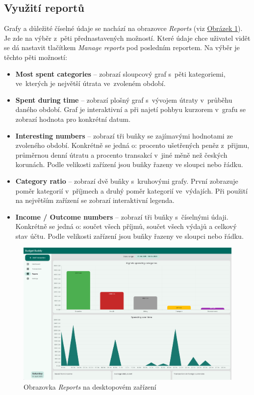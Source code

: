 \documentclass[
  biblatex,
  figures=true,
  tables=false,
  glossaries,
  index
]{kidiplom}
\begin{document}
\subsection{Využití reportů}
Grafy a důležité číselné údaje se nachází na obrazovce \textit{Reports} (viz \hyperref[fig:reports]{Obrázek \ref{fig:reports}}). Je zde na výběr z~pěti přednastavených možností. Které údaje chce uživatel vidět se dá nastavit tlačítkem \textit{Manage reports} pod posledním reportem. Na výběr je těchto pěti možností:
\begin{itemize}
  \item \textbf{Most spent categories} -- zobrazí sloupcový graf s~pěti kategoriemi, ve~kterých je největší útrata ve~zvoleném období.
  \item \textbf{Spent during time} -- zobrazí plošný graf s~vývojem útraty v~průběhu daného období. Graf je interaktivní a při najetí pohbyu kurzorem v~grafu se zobrazí hodnota pro konkrétní datum.
  \item \textbf{Interesting numbers} -- zobrazí tři buňky se zajímavými hodnotami ze zvoleného období. Konkrétně se jedná o: procento ušetřených peněz z~přijmu, průměrnou denní útratu a procento transakcí v~jiné měně než českých korunách. Podle velikosti zařízení jsou buňky řazeny ve sloupci nebo řádku.
  \item \textbf{Category ratio} -- zobrazí dvě buňky s~kruhovými grafy. První zobrazuje poměr kategorií v~příjmech a druhý poměr kategorií ve~výdajích. Při použití na největším zařízení se zobrazí interaktivní legenda.
  \item \textbf{Income / Outcome numbers} -- zobrazí tři buňky s~číselnými údaji. Konkrétně se jedná o: součet všech příjmů, součet všech výdajů a celkový stav účtu. Podle velikosti zařízení jsou buňky řazeny ve sloupci nebo řádku.
\end{itemize}

\begin{figure}
  \centering
  \includegraphics[width=\textwidth]{images/reports-large.png}
  \caption{Obrazovka \textit{Reports} na desktopovém zařízení}
  \label{fig:reports}
\end{figure}
\end{document}
